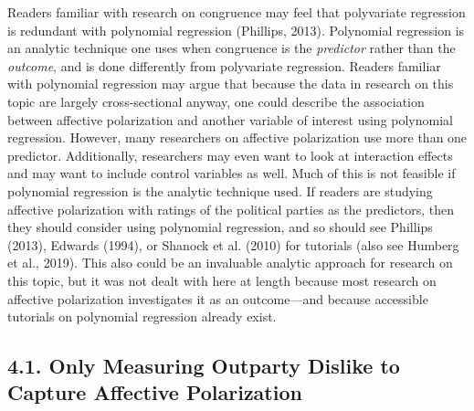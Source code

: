 \documentclass[authordate, meta, issue]{jote-new-article}
\begin{document}
	Readers familiar with research on congruence may feel that polyvariate regression is redundant with polynomial regression (Phillips, 2013). Polynomial regression is an analytic technique one uses when congruence is the \emph{predictor} rather than the \emph{outcome}, and is done differently from polyvariate regression. Readers familiar with polynomial regression may argue that because the data in research on this topic are largely cross-sectional anyway, one could describe the association between affective polarization and another variable of interest using polynomial regression. However, many researchers on affective polarization use more than one predictor. Additionally, researchers may even want to look at interaction effects and may want to include control variables as well. Much of this is not feasible if polynomial regression is the analytic technique used. If readers are studying affective polarization with ratings of the political parties as the predictors, then they should consider using polynomial regression, and so should see Phillips (2013), Edwards (1994), or Shanock et al. (2010) for tutorials (also see Humberg et al., 2019). This also could be an invaluable analytic approach for research on this topic, but it was not dealt with here at length because most research on affective polarization investigates it as an outcome—and because accessible tutorials on polynomial regression already exist.



	\subsection{4.1. Only Measuring Outparty Dislike to Capture Affective Polarization}
\end{document}
